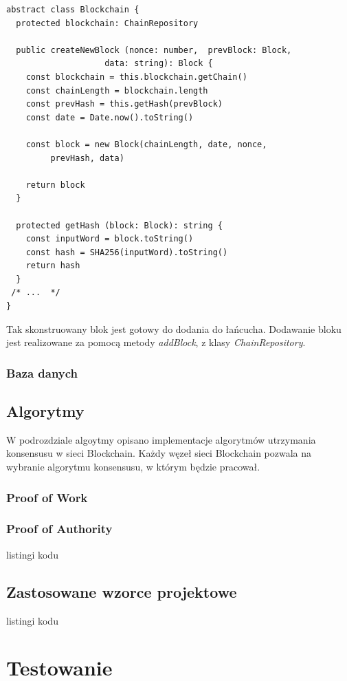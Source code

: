 \documentclass[a4paper,12pt]{book}
\begin{document}
\begin{lstlisting}[style=ES6, caption={Fragment klasy Blockchain.}]
abstract class Blockchain {
  protected blockchain: ChainRepository

  public createNewBlock (nonce: number,  prevBlock: Block, 
					data: string): Block {
    const blockchain = this.blockchain.getChain()
    const chainLength = blockchain.length
    const prevHash = this.getHash(prevBlock)
    const date = Date.now().toString()

    const block = new Block(chainLength, date, nonce,
		 prevHash, data)

    return block
  }

  protected getHash (block: Block): string {
    const inputWord = block.toString()
    const hash = SHA256(inputWord).toString()
    return hash
  }
 /* ...  */
}
\end{lstlisting}

Tak skonstruowany blok jest gotowy do dodania do łańcucha. Dodawanie bloku jest realizowane za pomocą metody \textit{addBlock}, z klasy \textit{ChainRepository}.

\subsection{Baza danych}

\section{Algorytmy}

W podrozdziale algoytmy opisano implementacje algorytmów utrzymania konsensusu w sieci Blockchain. Każdy węzeł sieci Blockchain pozwala na wybranie algorytmu konsensusu, w którym będzie pracował.

\subsection{Proof of Work}



\subsection{Proof of Authority}
listingi kodu
\section{Zastosowane wzorce projektowe}
listingi kodu
\chapter{Testowanie}
\end{document}
